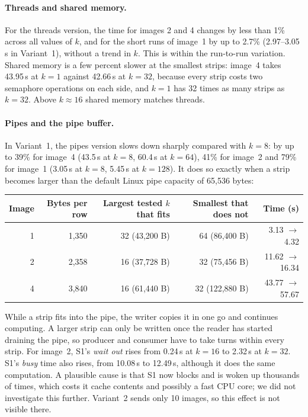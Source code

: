 \documentclass[11pt,a4paper]{article}
\newcommand{\cfgResults}{10}
\begin{document}
\paragraph{Threads and shared memory.} For the threads version, the time for images 2 and 4
changes by less than 1\% across all values of $k$, and for the short runs of image~1 by up to
2.7\% (2.97--3.05\,s in Variant~1), without a trend in $k$. This is within the run-to-run
variation. Shared memory is a few percent slower at the smallest strips: image~4 takes
43.95\,s at $k=1$ against 42.66\,s at $k=32$, because every strip costs two semaphore operations
on each side, and $k=1$ has 32 times as many strips as $k=32$. Above $k\approx16$ shared memory
matches threads.

\paragraph{Pipes and the pipe buffer.} In Variant~1, the pipes version slows down sharply
compared with $k=8$: by up to 39\% for image~4 (43.5\,s at $k=8$, 60.4\,s at $k=64$), 41\% for
image~2 and 79\% for image~1 (3.05\,s at $k=8$, 5.45\,s at $k=128$). It does so exactly when a strip
becomes larger than the default Linux pipe capacity of 65{,}536 bytes:
\begin{center}
\begin{tabular}{rrrrr}
\toprule
Image & Bytes per row & Largest tested $k$ that fits & Smallest that does not & Time (s) \\
\midrule
1 & 1{,}350 & 32 (43{,}200 B) & 64 (86{,}400 B) & 3.13 $\to$ 4.32 \\
2 & 2{,}358 & 16 (37{,}728 B) & 32 (75{,}456 B) & 11.62 $\to$ 16.34 \\
4 & 3{,}840 & 16 (61{,}440 B) & 32 (122{,}880 B) & 43.77 $\to$ 57.67 \\
\bottomrule
\end{tabular}
\end{center}
While a strip fits into the pipe, the writer copies it in one go and continues computing. A
larger strip can only be written once the reader has started draining the pipe, so producer and
consumer have to take turns within every strip. For image~2, S1's \emph{wait out} rises from
0.24\,s at $k=16$ to 2.32\,s at $k=32$. S1's \emph{busy} time also rises, from 10.08\,s to
12.49\,s, although it does the same computation. A plausible cause is that S1 now blocks and is
woken up thousands of times, which costs it cache contents and possibly a fast CPU core; we did
not investigate this further. Variant~2 sends only \cfgResults{} images, so this effect is not
visible there.
\end{document}
